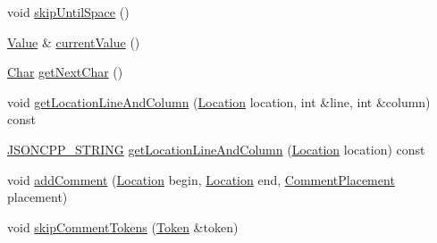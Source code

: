 \begin{DoxyCompactItemize}
void \hyperlink{classJson_1_1Reader_ad922ea5a8ab333084edbb84827861fa3}{skip\+Until\+Space} ()
\item 
\hyperlink{classJson_1_1Value}{Value} \& \hyperlink{classJson_1_1Reader_a85597f763fb0148a17359b6dfc6f7326}{current\+Value} ()
\item 
\hyperlink{classJson_1_1Reader_a3eec9118f3e9a672ba8348c3a79d0f45}{Char} \hyperlink{classJson_1_1Reader_ab61eb61333cc9ec3afe785663a53ce90}{get\+Next\+Char} ()
\item 
void \hyperlink{classJson_1_1Reader_a20b3023dc422726e2e4ebe41b8ba0515}{get\+Location\+Line\+And\+Column} (\hyperlink{classJson_1_1Reader_a46795b5b272bf79a7730e406cb96375a}{Location} location, int \&line, int \&column) const 
\item 
\hyperlink{json_8hpp_a1e723f95759de062585bc4a8fd3fa4be}{J\+S\+O\+N\+C\+P\+P\+\_\+\+S\+T\+R\+I\+NG} \hyperlink{classJson_1_1Reader_ac7476b9a3e9868448cd6dc5f6f8091d8}{get\+Location\+Line\+And\+Column} (\hyperlink{classJson_1_1Reader_a46795b5b272bf79a7730e406cb96375a}{Location} location) const 
\item 
void \hyperlink{classJson_1_1Reader_aaea3bd62d12ffb6117a61476c0685049}{add\+Comment} (\hyperlink{classJson_1_1Reader_a46795b5b272bf79a7730e406cb96375a}{Location} begin, \hyperlink{classJson_1_1Reader_a46795b5b272bf79a7730e406cb96375a}{Location} end, \hyperlink{namespaceJson_a4fc417c23905b2ae9e2c47d197a45351}{Comment\+Placement} placement)
\item 
void \hyperlink{classJson_1_1Reader_a22e677ef400d8223f27e631b4cd4b821}{skip\+Comment\+Tokens} (\hyperlink{classJson_1_1Reader_1_1Token}{Token} \&token)
\end{DoxyCompactItemize}
